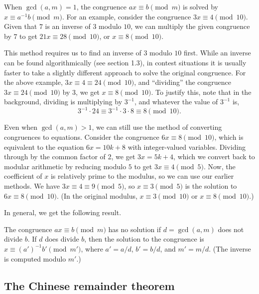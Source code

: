 When $\gcd(a,m) = 1$, the congruence $ax\equiv b\pmod{m}$ is solved by $x\equiv a^{-1}b\pmod{m}$. For an example, consider the congruence $3x\equiv 4\pmod{10}$. Given that $7$ is an inverse of $3$ modulo $10$, we can multiply the given congruence by $7$ to get $21x\equiv 28\pmod{10}$, or $x\equiv 8\pmod{10}$.

This method requires us to find an inverse of $3$ modulo $10$ first. While an inverse can be found algorithmically (see section 1.3), in contest situations it is usually faster to take a slightly different approach to solve the original congruence. For the above example, $3x\equiv 4\equiv 24\pmod{10}$, and ``dividing'' the congruence $3x\equiv 24\pmod{10}$ by $3$, we get $x\equiv 8\pmod{10}$. To justify this, note that in the background, dividing is multiplying by $3^{-1}$, and whatever the value of $3^{-1}$ is,
\begin{equation*}
3^{-1}\cdot 24\equiv 3^{-1}\cdot 3\cdot 8\equiv 8\pmod{10}.
\end{equation*}

Even when $\gcd(a,m) > 1$, we can still use the method of converting congruences to equations. Consider the congruence $6x\equiv 8\pmod{10}$, which is equivalent to the equation $6x = 10k + 8$ with integer-valued variables. Dividing through by the common factor of 2, we get $3x = 5k + 4$, which we convert back to modular arithmetic by reducing modulo $5$ to get $3x\equiv 4\pmod{5}$. Now, the coefficient of $x$ is relatively prime to the modulus, so we can use our earlier methods. We have $3x\equiv 4\equiv 9\pmod{5}$, so $x\equiv 3\pmod{5}$ is the solution to $6x\equiv 8\pmod{10}$. (In the original modulus, $x\equiv 3\pmod{10}$ or $x\equiv 8\pmod{10}$.)

In general, we get the following result.
\begin{proposition}
The congruence $ax\equiv b\pmod{m}$ has no solution if $d = \gcd(a,m)$ does not divide $b$. If $d$ does divide $b$, then the solution to the congruence is $x\equiv (a')^{-1}b'\pmod{m'}$, where $a' = a/d$, $b' = b/d$, and $m' = m/d$. (The inverse is computed modulo $m'$.)
\end{proposition}


\subsection{The Chinese remainder theorem}

